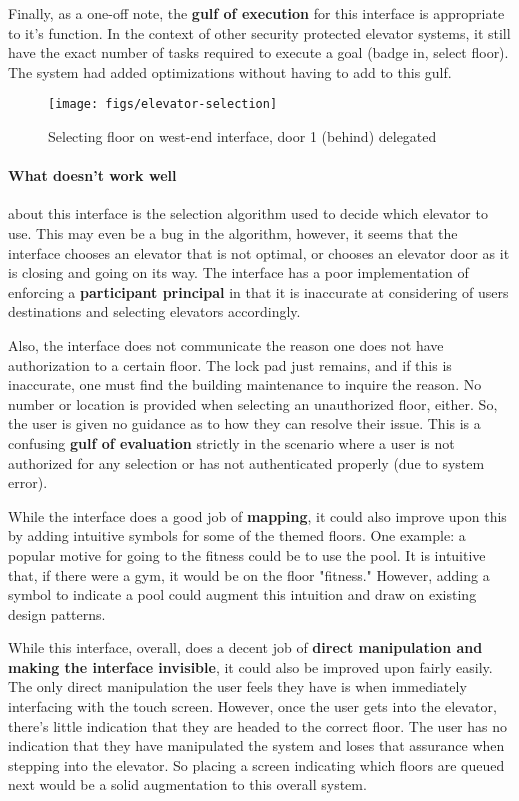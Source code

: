 Finally, as a one-off note, the \textbf{gulf of execution} for this interface is appropriate to it's function. In the context of other security protected elevator systems, it still have the exact number of tasks required to execute a goal (badge in, select floor). The system had added optimizations without having to add to this gulf.

\begin{figure}[H]
  \centering
  \texttt{[image: figs/elevator-selection]}
  \caption{Selecting floor on west-end interface, door 1 (behind) delegated}
  \label{fig::1}
\end{figure}

\paragraph{What doesn't work well} about this interface is the selection algorithm used to decide which elevator to use. This may even be a bug in the algorithm, however, it seems that the interface chooses an elevator that is not optimal, or chooses an elevator door as it is closing and going on its way. The interface has a poor implementation of enforcing a \textbf{participant principal} in that it is inaccurate at considering of users destinations and selecting elevators accordingly.

Also, the interface does not communicate the reason one does not have authorization to a certain floor. The lock pad just remains, and if this is inaccurate, one must find the building maintenance to inquire the reason. No number or location is provided when selecting an unauthorized floor, either. So, the user is given no guidance as to how they can resolve their issue. This is a confusing \textbf{gulf of evaluation} strictly in the scenario where a user is not authorized for any selection or has not authenticated properly (due to system error).

While the interface does a good job of \textbf{mapping}, it could also improve upon this by adding intuitive symbols for some of the themed floors. One example: a popular motive for going to the fitness could be to use the pool. It is intuitive that, if there were a gym, it would be on the floor "fitness." However, adding a symbol to indicate a pool could augment this intuition and draw on existing design patterns.

While this interface, overall, does a decent job of \textbf{direct manipulation and making the interface invisible}, it could also be improved upon fairly easily. The only direct manipulation the user feels they have is when immediately interfacing with the touch screen. However, once the user gets into the elevator, there's little indication that they are headed to the correct floor. The user has no indication that they have manipulated the system and loses that assurance when stepping into the elevator. So placing a screen indicating which floors are queued next would be a solid augmentation to this overall system.

